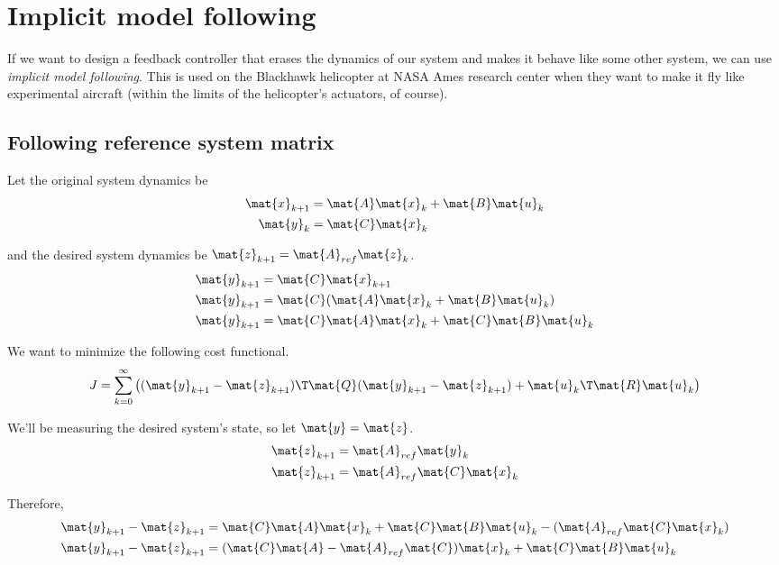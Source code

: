 \section{Implicit model following}
\label{sec:implicit_model_following}

If we want to design a feedback controller that erases the dynamics of our
system and makes it behave like some other system, we can use \textit{implicit
model following}. This is used on the Blackhawk helicopter at NASA Ames research
center when they want to make it fly like experimental aircraft (within the
limits of the helicopter's actuators, of course).

\subsection{Following reference system matrix}

Let the original system dynamics be
\begin{align*}
  \mat{x}_{k+1} &= \mat{A}\mat{x}_k + \mat{B}\mat{u}_k \\
  \mat{y}_k &= \mat{C}\mat{x}_k
\end{align*}

and the desired system dynamics be $\mat{z}_{k+1} = \mat{A}_{ref}\mat{z}_k$.
\begin{align*}
  \mat{y}_{k+1} &= \mat{C}\mat{x}_{k+1} \\
  \mat{y}_{k+1} &= \mat{C}(\mat{A}\mat{x}_k + \mat{B}\mat{u}_k) \\
  \mat{y}_{k+1} &= \mat{C}\mat{A}\mat{x}_k + \mat{C}\mat{B}\mat{u}_k
\end{align*}

We want to minimize the following cost functional.
\begin{equation*}
  J = \sum_{k=0}^\infty \left((\mat{y}_{k+1} - \mat{z}_{k+1})\T \mat{Q}
    (\mat{y}_{k+1} - \mat{z}_{k+1}) + \mat{u}_k\T\mat{R}\mat{u}_k\right)
\end{equation*}

We'll be measuring the desired system's state, so let $\mat{y} = \mat{z}$.
\begin{align*}
  \mat{z}_{k+1} &= \mat{A}_{ref}\mat{y}_k \\
  \mat{z}_{k+1} &= \mat{A}_{ref}\mat{C}\mat{x}_k
\end{align*}

Therefore,
\begin{align*}
  \mat{y}_{k+1} - \mat{z}_{k+1} &=
    \mat{C}\mat{A}\mat{x}_k + \mat{C}\mat{B}\mat{u}_k -
    (\mat{A}_{ref}\mat{C}\mat{x}_k) \\
  \mat{y}_{k+1} - \mat{z}_{k+1} &=
    (\mat{C}\mat{A} - \mat{A}_{ref}\mat{C})\mat{x}_k + \mat{C}\mat{B}\mat{u}_k
\end{align*}

